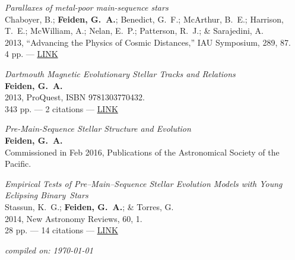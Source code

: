 \documentclass[12pt,letter]{article}
\begin{document}
\begin{etaremune}[leftmargin=0.30in]
    \item \emph{Parallaxes of metal-poor main-sequence stars} \\
    Chaboyer, B.; {\bf Feiden, G.~A.}; Benedict, G.~F.; McArthur, B.~E.; Harrison, T.~E.; McWilliam, A.; Nelan, E.~P.; Patterson, R.~J.; \& Sarajedini, A. \\
    2013, ``Advancing the Physics of Cosmic Distances,'' IAU Symposium, 289, 87. \\
    4 pp. --- \href{http://adsabs.harvard.edu/abs/2013IAUS..289...87C}{LINK}
\end{etaremune}

\vspace{\baselineskip}

\begin{etaremune}[leftmargin=0.30in]
	\item \emph{Dartmouth Magnetic Evolutionary Stellar Tracks and Relations} \\
		{\bf Feiden, G.~A.} \\
		2013, ProQuest, ISBN 9781303770432. \\
		343 pp. --- 2 citations --- \href{http://adsabs.harvard.edu/abs/2013PhDT.......149F}{LINK}
\end{etaremune}

\vspace{\baselineskip}


\begin{etaremune}[leftmargin=0.30in]
	\item \emph{Pre-Main-Sequence Stellar Structure and Evolution} \\
		{\bf Feiden, G.~A.} \\
		Commissioned in Feb 2016, Publications of the Astronomical Society of the Pacific. 
		
	\item {\it Empirical Tests of Pre--Main--Sequence Stellar Evolution Models with Young Eclipsing Binary~Stars} \\
          Stassun, K.~G.; {\bf Feiden, G.~A.}; \& Torres, G. \\
          2014, New Astronomy Reviews, 60, 1. \\
          28 pp. --- 14 citations --- \href{http://adsabs.harvard.edu/abs/2014NewAR..60....1S}{LINK}
\end{etaremune}

%
%
%	

\vspace{\baselineskip}

\begin{flushright}
	\emph{\footnotesize compiled on: \today}
\end{flushright}
\end{document}

